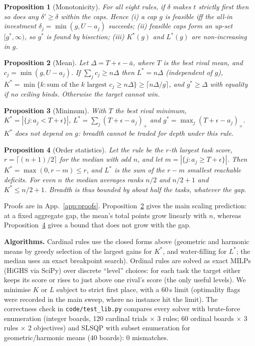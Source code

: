 \documentclass{article}
\newtheorem{proposition}{Proposition}
\theoremstyle{remark}
\begin{document}
\begin{proposition}[Monotonicity]\label{prop:mono}
For all eight rules, if $\delta$ makes $t$ strictly first then so does any $\delta'\ge\delta$ within the caps. Hence (i) a cap $g$ is feasible iff the all-in investment $\delta_j=\min(g,U-a_j)$ succeeds; (ii) feasible caps form an up-set $[g^\ast,\infty)$, so $g^\ast$ is found by bisection; (iii) $K^\ast(g)$ and $L^\ast(g)$ are non-increasing in $g$.
\end{proposition}
\begin{proposition}[Mean]\label{prop:mean}
Let $\Delta=T+\epsilon-\bar a$, where $T$ is the best rival mean, and $c_j=\min(g,U-a_j)$. If $\sum_jc_j\ge n\Delta$ then $L^\ast=n\Delta$ (independent of $g$), $K^\ast=\min\{k:\text{sum of the }k\text{ largest }c_j\ge n\Delta\}\ge\lceil n\Delta/g\rceil$, and $g^\ast\ge\Delta$ with equality if no ceiling binds. Otherwise the target cannot win.
\end{proposition}
\begin{proposition}[Minimum]\label{prop:min}
With $T$ the best rival minimum, $K^\ast=|\{j:a_j<T+\epsilon\}|$, $L^\ast=\sum_j(T+\epsilon-a_j)_+$ and $g^\ast=\max_j(T+\epsilon-a_j)_+$. $K^\ast$ does not depend on $g$: breadth cannot be traded for depth under this rule.
\end{proposition}
\begin{proposition}[Order statistics]\label{prop:order}
Let the rule be the $r$-th largest task score, $r=\lceil (n+1)/2\rceil$ for the median with odd $n$, and let $m=|\{j:a_j\ge T+\epsilon\}|$. Then $K^\ast=\max(0,r-m)\le r$, and $L^\ast$ is the sum of the $r-m$ smallest reachable deficits. For even $n$ the median averages ranks $n/2$ and $n/2+1$ and $K^\ast\le n/2+1$. Breadth is thus bounded by about half the tasks, whatever the gap.
\end{proposition}
Proofs are in App.~\ref{app:proofs}. Proposition~\ref{prop:mean} gives the main scaling prediction: at a fixed aggregate gap, the mean's total points grow linearly with $n$, whereas Proposition~\ref{prop:order} gives a bound that does not grow with the gap.

\textbf{Algorithms.} Cardinal rules use the closed forms above (geometric and harmonic means by greedy selection of the largest gains for $K^\ast$, and water-filling for $L^\ast$; the median uses an exact breakpoint search). Ordinal rules are solved as exact MILPs (HiGHS via SciPy) over discrete ``level'' choices: for each task the target either keeps its score or rises to just above one rival's score (the only useful levels). We minimise $K$ or $L$ subject to strict first place, with a 60\,s limit (optimality flags were recorded in the main sweep, where no instance hit the limit). The correctness check in \texttt{code/test\_lib.py} compares every solver with brute-force enumeration (integer boards, 120 cardinal trials $\times$ 3 rules; 60 ordinal boards $\times$ 3 rules $\times$ 2 objectives) and SLSQP with subset enumeration for geometric/harmonic means (40 boards): 0 mismatches.
\end{document}
